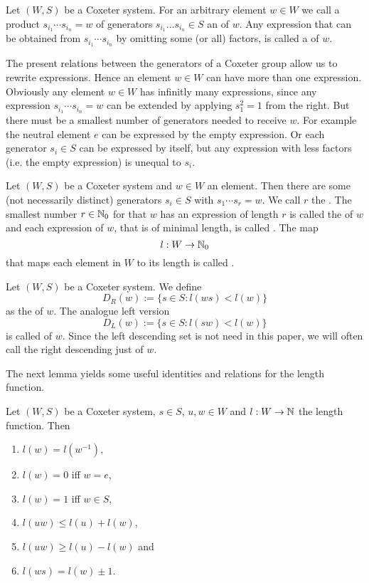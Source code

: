 \begin{defi}
	Let $(W,S)$ be a Coxeter system. For an arbitrary element $w \in W$ we call a product $s_{i_1} \cdots s_{i_n} = w$ of generators $s_{i_1} \ldots s_{i_n} \in S$ an  of $w$. Any expression that can be obtained from $s_{i_1} \cdots s_{i_n}$ by omitting some (or all) factors, is called a  of $w$.
\end{defi}

The present relations between the generators of a Coxeter group allow us to rewrite expressions. Hence an element $w \in W$ can have more than one expression. Obviously any element $w \in W$ has infinitly many expressions, since any expression $s_{i_1} \cdots s_{i_n} = w$ can be extended by applying $s_1^2 = 1$ from the right. But there must be a smallest number of generators needed to receive $w$. For example the neutral element $e$ can be expressed by the empty expression. Or each generator $s_i \in S$ can be expressed by itself, but any expression with less factors (i.e. the empty expression) is unequal to $s_i$.

\begin{defi}
	Let $(W,S)$ be a Coxeter system and $w \in W$ an element. Then there are some (not necessarily distinct) generators $s_i \in S$ with $s_1 \cdots s_r = w$. We call $r$ the . The smallest number $r \in \mathbb{N}_0$ for that $w$ has an expression of length $r$ is called the  of $w$ and each expression of $w$, that is of minimal length, is called . The map
	$$ l : W \to \mathbb{N}_0 $$
	that maps each element in $W$ to its length is called .
\end{defi}

\begin{defi}
	Let $(W,S)$ be a Coxeter system. We define
	$$ D_R(w) := \{ s \in S : l(ws) < l(w) \} $$
	as the  of $w$. The analogue left version
	$$ D_L(w) := \{ s \in S : l(sw) < l(w) \} $$
	is called  of $w$. Since the left descending set is not need in this paper, we will often call the right descending just  of $w$.
\end{defi}

The next lemma yields some useful identities and relations for the length function.

\begin{lemm}
	Let $(W,S)$ be a Coxeter system, $s \in S$, $u, w \in W$ and $l : W \to \mathbb{N}$ the length function. Then
	\begin{enumerate}
		\item $l(w) = l(w^{-1})$,
		\item $l(w) = 0$ iff $w = e$,
		\item $l(w) = 1$ iff $w \in S$,
		\item $l(uw) \leq l(u) + l(w)$,
		\item $l(uw) \geq l(u) - l(w)$ and
		\item $l(ws) = l(w) \pm 1$.
	\end{enumerate}
\end{lemm}